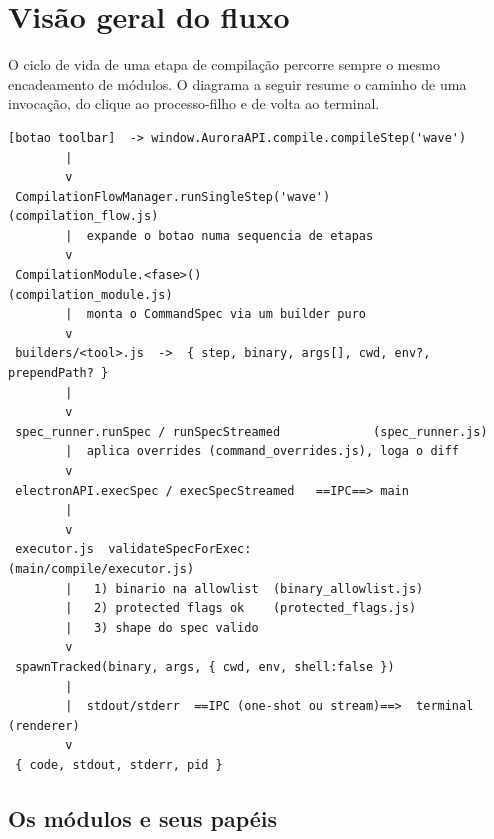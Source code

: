 \section{Visão geral do fluxo}
\label{sec:08-visao-geral}

O ciclo de vida de uma etapa de compilação percorre sempre o mesmo encadeamento
de módulos. O diagrama a seguir resume o caminho de uma invocação, do clique ao
processo-filho e de volta ao terminal.

\begin{lstlisting}[basicstyle=\ttfamily\footnotesize]
 [botao toolbar]  -> window.AuroraAPI.compile.compileStep('wave')
        |
        v
 CompilationFlowManager.runSingleStep('wave')      (compilation_flow.js)
        |  expande o botao numa sequencia de etapas
        v
 CompilationModule.<fase>()                         (compilation_module.js)
        |  monta o CommandSpec via um builder puro
        v
 builders/<tool>.js  ->  { step, binary, args[], cwd, env?, prependPath? }
        |
        v
 spec_runner.runSpec / runSpecStreamed             (spec_runner.js)
        |  aplica overrides (command_overrides.js), loga o diff
        v
 electronAPI.execSpec / execSpecStreamed   ==IPC==> main
        |
        v
 executor.js  validateSpecForExec:                  (main/compile/executor.js)
        |   1) binario na allowlist  (binary_allowlist.js)
        |   2) protected flags ok    (protected_flags.js)
        |   3) shape do spec valido
        v
 spawnTracked(binary, args, { cwd, env, shell:false })
        |
        |  stdout/stderr  ==IPC (one-shot ou stream)==>  terminal (renderer)
        v
 { code, stdout, stderr, pid }
\end{lstlisting}

\subsection{Os módulos e seus papéis}

